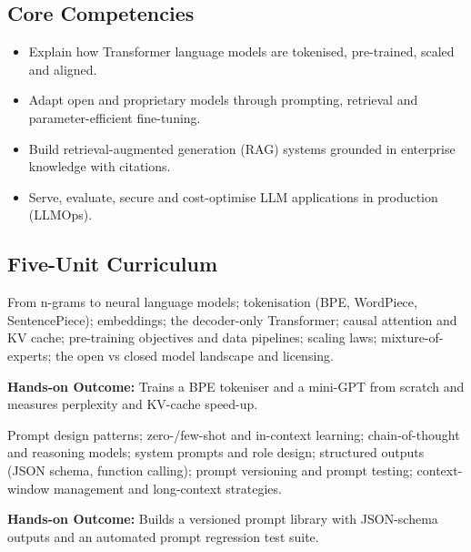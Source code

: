 \documentclass[10pt,a4paper]{article}
\begin{document}
\subsection*{Core Competencies}\begin{itemize}\small
\item Explain how Transformer language models are tokenised, pre-trained, scaled and aligned.
\item Adapt open and proprietary models through prompting, retrieval and parameter-eﬀicient fine-tuning.
\item Build retrieval-augmented generation (RAG) systems grounded in enterprise knowledge with citations.
\item Serve, evaluate, secure and cost-optimise LLM applications in production (LLMOps).
\end{itemize}
\subsection*{Five-Unit Curriculum}
\begin{tcolorbox}[unitbox,title={{\color{gold}UNIT I}\quad Language Modelling Foundations\hfill{\color{gold}9 Hours}}]\small From n-grams to neural language models; tokenisation (BPE, WordPiece, SentencePiece); embeddings; the decoder-only Transformer; causal attention and KV cache; pre-training objectives and data pipelines; scaling laws; mixture-of-experts; the open vs closed model landscape and licensing.\par\vspace{2pt}\par\textbf{Hands-on Outcome:} Trains a BPE tokeniser and a mini-GPT from scratch and measures perplexity and KV-cache speed-up.\end{tcolorbox}
\begin{tcolorbox}[unitbox,title={{\color{gold}UNIT II}\quad Prompting, Reasoning and Structured Output\hfill{\color{gold}9 Hours}}]\small Prompt design patterns; zero-/few-shot and in-context learning; chain-of-thought and reasoning models; system prompts and role design; structured outputs (JSON schema, function calling); prompt versioning and prompt testing; context-window management and long-context strategies.\par\vspace{2pt}\par\textbf{Hands-on Outcome:} Builds a versioned prompt library with JSON-schema outputs and an automated prompt regression test suite.\end{tcolorbox}
\end{document}
